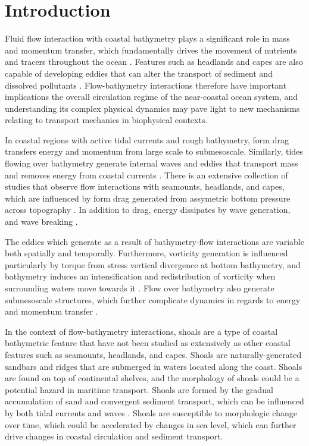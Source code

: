
\section{Introduction}

Fluid flow interaction with coastal bathymetry plays a significant role in mass and momentum transfer, which fundamentally drives the movement of nutrients and tracers throughout the ocean \cite{pawlak03}. Features such as headlands and capes are also capable of developing eddies that can alter the transport of sediment and dissolved pollutants \cite{bastos03}. Flow-bathymetry interactions therefore have important implications the overall circulation regime of the near-coastal ocean system, and understanding its complex physical dynamics may pave light to new mechanisms relating to transport mechanics in biophysical contexts.

In coastal regions with active tidal currents and rough bathymetry, form drag transfers energy and momentum from large scale to submesoscale. Similarly, tides flowing over bathymetry generate internal waves and eddies that transport mass and removes energy from coastal currents \cite{warner14}. There is an extensive collection of studies that observe flow interactions with seamounts, headlands, and capes, which are influenced by form drag generated from assymetric bottom pressure across topography \cite{chor25}. In addition to drag, energy dissipates by wave generation, and wave breaking \cite{klymak21, zemskova21}. 

The eddies which generate as a result of bathymetry-flow interactions are variable both spatially and temporally. Furthermore, vorticity generation is influenced particularly by torque from stress vertical divergence at bottom bathymetry, and bathymetry induces an intensification and redistribution of vorticity when surrounding waters move towards it \cite{jagannathan20}. Flow over bathymetry also generate submesoscale structures, which further complicate dynamics in regards to energy and momentum transfer \cite{srinivasan21}. 

In the context of flow-bathymetry interactions, shoals are a type of coastal bathymetric feature that have not been studied as extensively as other coastal features such as seamounts, headlands, and capes. Shoals are naturally-generated sandbars and ridges that are submerged in waters located along the coast. Shoals are found on top of continental shelves, and the morphology of shoals could be a potential hazard in maritime transport. Shoals are formed by the gradual accumulation of sand and convergent sediment transport, which can be influenced by both tidal currents and waves \cite{ashton01}. Shoals are susceptible to morphologic change over time, which could be accelerated by changes in sea level, which can further drive changes in coastal circulation and sediment transport. 

